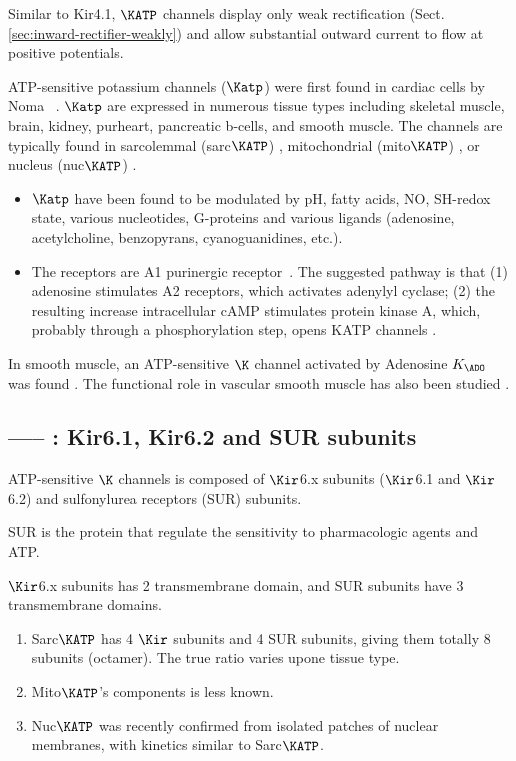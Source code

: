 Similar to Kir4.1, $\KATP$ channels display only weak rectification
(Sect.\ref{sec:inward-rectifier-weakly}) and allow substantial outward current
to flow at positive potentials.

ATP-sensitive potassium channels ($\Katp$) were first found in cardiac cells by
Noma ~\citep{Noma1983}. $\Katp$ are expressed in numerous tissue types including
skeletal muscle, brain, kidney, purheart, pancreatic b-cells, and smooth muscle.
The channels are typically found in sarcolemmal (sarc$\KATP$)
\citep{inagaki1995}, mitochondrial (mito$\KATP$) \citep{inoue1991}, or nucleus
(nuc$\KATP$) \citep{quesada2002}.
\begin{itemize}

  \item $\Katp$ have been found to be modulated by pH, fatty acids, NO, SH-redox
  state, various nucleotides, G-proteins and various ligands (adenosine,
  acetylcholine, benzopyrans, cyanoguanidines, etc.).
  
  \item  The receptors are A1 purinergic receptor~\citep{sorota1998}.  The
  suggested pathway is that (1) adenosine stimulates A2 receptors, which
  activates adenylyl cyclase; (2) the resulting
increase  intracellular cAMP stimulates protein kinase A, which, probably
through a phosphorylation step, opens KATP channels \citep{kleppisch1995}.
\end{itemize}


In smooth muscle, an ATP-sensitive $\K$ channel activated by Adenosine $K_\ADO$
was found \citep{kleppisch1995}. The functional role in vascular smooth muscle
has also been studied \citep{brayden2002}.

\subsection{----- : Kir6.1, Kir6.2 and SUR subunits}
\label{sec:Kir_KATP_Kir6.1-6.2-SUR}
\label{sec:SUR-protein}

ATP-sensitive $\K$ channels is composed of $\Kir$6.x subunits ($\Kir$6.1 and
$\Kir$6.2) and sulfonylurea receptors (SUR) subunits. 

SUR is the protein that regulate the sensitivity to pharmacologic agents and
ATP. 

$\Kir$6.x subunits has 2 transmembrane domain, and SUR subunits have 3
transmembrane domains.
\begin{enumerate}
  \item Sarc$\KATP$ has 4 $\Kir$ subunits and 4 SUR subunits, giving them
  totally 8 subunits (octamer). The true ratio varies upone tissue type.
  \item Mito$\KATP$'s components is less known.
  \item Nuc$\KATP$ was recently confirmed from isolated patches of nuclear
  membranes, with kinetics similar to Sarc$\KATP$.
\end{enumerate}

